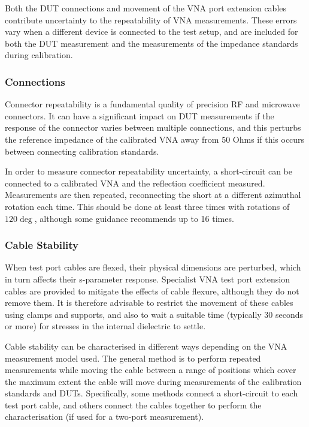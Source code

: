 \documentclass[../thesis/thesis.tex]{subfiles}
\begin{document}
Both the DUT connections and movement of the VNA port extension cables contribute uncertainty to the repeatability of VNA measurements. These errors vary when a different device is connected to the test setup, and are included for both the DUT measurement and the measurements of the impedance standards during calibration.

\subsubsection{Connections}

Connector repeatability is a fundamental quality of precision RF and microwave connectors. It can have a significant impact on DUT measurements if the response of the connector varies between multiple connections, and this perturbs the reference impedance of the calibrated VNA away from $50$ Ohms if this occurs between connecting calibration standards.

In order to measure connector repeatability uncertainty, a short-circuit can be connected to a calibrated VNA and the reflection coefficient measured. Measurements are then repeated, reconnecting the short at a different azimuthal rotation each time. This should be done at least three times with rotations of $120\deg$, although some guidance recommends up to 16 times\cite{EURAMET_2011}.

\subsubsection{Cable Stability}

When test port cables are flexed, their physical dimensions are perturbed, which in turn affects their s-parameter response. Specialist VNA test port extension cables are provided to mitigate the effects of cable flexure, although they do not remove them. It is therefore advisable to restrict the movement of these cables using clamps and supports, and also to wait a suitable time (typically 30 seconds or more) for stresses in the internal dielectric to settle.

Cable stability can be characterised in different ways depending on the VNA measurement model used. The general method is to perform repeated measurements while moving the cable between a range of positions which cover the maximum extent the cable will move during measurements of the calibration standards and DUTs. Specifically, some methods connect a short-circuit to each test port cable, and others connect the cables together to perform the characterisation (if used for a two-port measurement).
\end{document}
